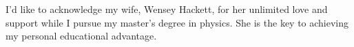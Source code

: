 \begin{acknowledgments}
    I'd like to acknowledge my wife, Wensey Hackett, for her unlimited love and support while I pursue my master's degree in physics. She is the key to achieving my personal educational advantage.
    \end{acknowledgments}